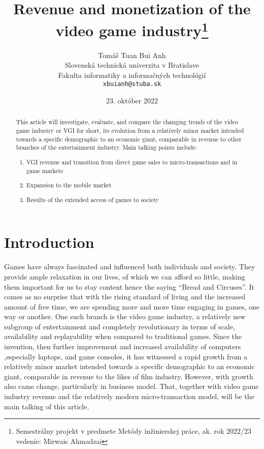 \documentclass[10pt,british,a4paper,titlepage]{article}
\title{Revenue and monetization of the video game industry\thanks{Semestrálny projekt v predmete Metódy inžinierskej práce, ak. rok 2022/23 \\vedenie: Mirwais Ahmadzai}}
\author{Tomáš Tuan Bui Anh\\[2pt]
	{\small Slovenská technická univerzita v Bratislave}\\
	{\small Fakulta informatiky a informačných technológií}\\
	{\small \texttt{xbuianh@stuba.sk}}
	}
\date{\small 23. október 2022}
\begin{document}
\maketitle

\begin{abstract}
This article will investigate, evaluate, and compare the changing trends of the video game industry or VGI for short, its evolution from a relatively minor market intended towards a specific demographic to an economic giant, comparable in revenue to other branches of the entertainment industry. Main talking points include:
\begin{enumerate}
\item VGI revenue and transition from direct game sales to micro-transactions and in game markets
\item Expansion to the mobile market
\item Results of the extended access of games to society 
\end{enumerate}
\end{abstract}



\section{Introduction}

Games have always fascinated and influenced both individuals and society. They provide ample relaxation in our lives, of which we can afford so little, making them important for us to stay content hence the saying “Bread and Circuses”. It comes as no surprise that with the rising standard of living and the increased amount of free time, we are spending more and more time engaging in games, one way or another. One such branch is the video game industry, a relatively new subgroup of entertainment and completely revolutionary in terms of scale, availability and replayability when compared to traditional games. Since the invention, then further improvement and increased availability of computers ,especially laptops, and game consoles, it has witnessed a rapid growth from a relatively minor market intended towards a specific demographic to an economic giant, comparable in revenue to the likes of film industry. However, with growth also came change, particularly in business model. That, together with video game industry revenue and the relatively modern micro-transaction model, will be the main talking of this article.
\end{document}
